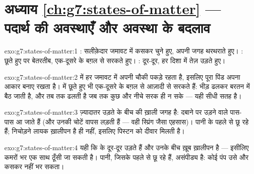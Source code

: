\section*{अध्याय \ref{ch:g7:states-of-matter} --- पदार्थ की अवस्थाएँ और अवस्था के बदलाव}

\begin{solution}{exo:g7:states-of-matter:1}
:  सलीक़ेदार जमावट में कसकर चुने हुए, अपनी जगह थरथराते हुए। :
 छूते हुए पर बेतरतीब, एक-दूसरे के बग़ल से सरकते हुए। : 
दूर-दूर, हर दिशा में तेज़ उड़ते हुए।
\end{solution}

\begin{solution}{exo:g7:states-of-matter:2}
 में हर  जमावट में अपनी चौकी पकड़े रहता है, इसलिए पूरा पिंड अपना
आकार बनाए रखता है।  में  छूते हुए भी एक-दूसरे के बग़ल से आज़ादी
से सरकते हैं: भीड़ ढलकर बरतन में बैठ जाती है, और तब तक ढलती है जब तक
कुछ और नीचे सरक ही न सके --- यही सीधी सतह है।
\end{solution}

\begin{solution}{exo:g7:states-of-matter:3}
 ज़्यादातर उड़ते  के बीच की ख़ाली जगह है: दबाने पर उड़ने वाले
पास-पास आ जाते हैं (और उनकी चोटें वापस लड़ती हैं --- वही स्प्रिंग
जैसा एहसास)। पानी के  पहले से छू रहे हैं; निचोड़ने लायक ख़ालीपन है
ही नहीं, इसलिए पिस्टन को दीवार मिलती है।
\end{solution}

\begin{solution}{exo:g7:states-of-matter:4}
यही कि  के  दूर-दूर उड़ते हैं और उनके बीच ख़ूब ख़ालीपन है ---
इसीलिए कमरों भर  एक साथ ठूँसी जा सकती है। पानी, जिसके  पहले से
छू रहे हैं, असंपीड्य है: कोई पंप उसे और कसकर नहीं भर सकता।
\end{solution}

